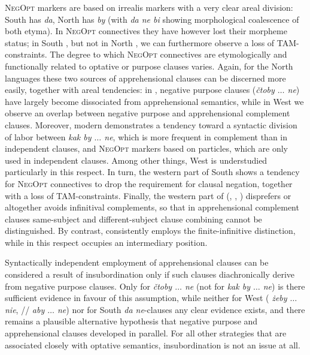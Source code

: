\documentclass[output=paper,colorlinks,citecolor=brown]{langscibook}
\begin{document}
\textsc{NegOpt} markers are based on irrealis markers with a very clear areal division: South  has \textit{da}, North  has \textit{by} (with  \textit{da ne bi} showing morphological coalescence of both etyma). In \textsc{NegOpt} connectives they have however lost their morpheme status; in South , but not in North , we can furthermore observe a loss of TAM-constraints. The degree to which \textsc{NegOpt} connectives are etymologically and functionally related to optative or purpose clauses varies. Again, for the North  languages these two sources of apprehensional clauses can be discerned more easily, together with areal tendencies: in , negative purpose clauses (\textit{čtoby $\ldots$ ne}) have largely become dissociated from apprehensional semantics, while in West  we observe an overlap between negative purpose and apprehensional complement clauses. Moreover, modern  demonstrates a tendency toward a syntactic division of labor between \textit{kak by $\ldots$  ne}, which is more frequent in complement than in independent clauses, and \textsc{NegOpt} markers based on particles, which are only used in independent clauses. Among other things, West  is understudied particularly in this respect. In turn, the western part of South  shows a tendency for \textsc{NegOpt} connectives to drop the requirement for clausal negation, together with a loss of TAM-constraints. Finally, the western part of  (, , ) disprefers or altogether avoids infinitival complements, so that in apprehensional complement clauses same-subject and different-subject clause combining cannot be distinguished. By contrast,  consistently employs the finite-infinitive distinction, while  in this respect occupies an intermediary position.


Syntactically independent employment of apprehensional clauses can be considered a result of insubordination only if such clauses diachronically derive from negative purpose clauses. Only for  \textit{čtoby $\ldots$  ne} (not for \textit{kak by $\ldots$  ne}) is there sufficient evidence in favour of this assumption, while neither for West  ( \textit{żeby $\ldots$  nie}, // \textit{aby $\ldots$ ne}) nor for South  \textit{da ne}-clauses any clear evidence exists, and there remains a plausible alternative hypothesis that negative purpose and apprehensional clauses developed in parallel. For all other strategies that are associated closely with optative semantics, insubordination is not an issue at all.
\end{document}
